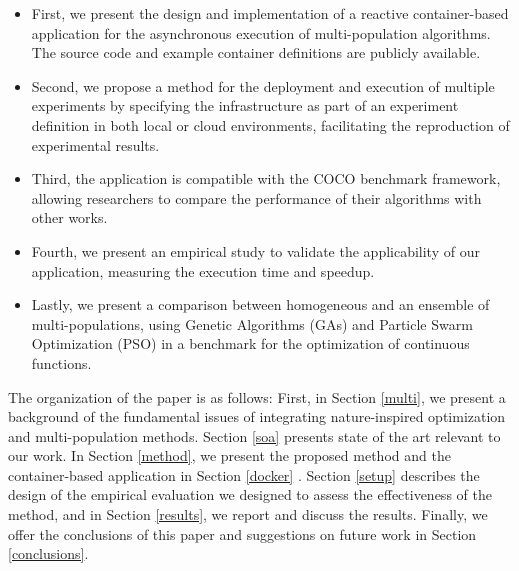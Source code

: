 \documentclass[review]{elsarticle}
\begin{document}
\begin{itemize}
    \item First, we present the design and implementation of a reactive 
    container-based application for the asynchronous execution of multi-population 
    algorithms. The source code and example container definitions are
    publicly available. %
    \item Second, we propose a method for the deployment and execution of 
    multiple experiments by specifying the infrastructure as part of an 
    experiment definition in both local or cloud environments,
    facilitating the reproduction of experimental results. %
    \item Third, the application is compatible with the COCO benchmark 
    framework, allowing researchers to compare the performance of their 
    algorithms with other works. %
    \item Fourth, we present an empirical study to validate the 
    applicability of our application,  measuring the execution time and  
    speedup.
    
    \item Lastly, we present a comparison between homogeneous and an ensemble of 
    multi-populations, using Genetic Algorithms (GAs) and Particle 
    Swarm Optimization (PSO) in a benchmark for the optimization of 
    continuous functions. %
\end{itemize}

The organization of the paper is as follows: First, in Section \ref{multi}, we present a
background of the fundamental issues of integrating nature-inspired optimization
and multi-population methods. Section \ref{soa} presents state of the art relevant to
our work. In Section \ref{method}, we present the proposed method and the container-based
application in Section \ref{docker} .  Section \ref{setup} describes
the design of the empirical evaluation we designed to assess the effectiveness
of the method, and in Section \ref{results}, we report and discuss the results. Finally, we
offer the conclusions of this paper and suggestions on future work in Section \ref{conclusions}.
\end{document}
